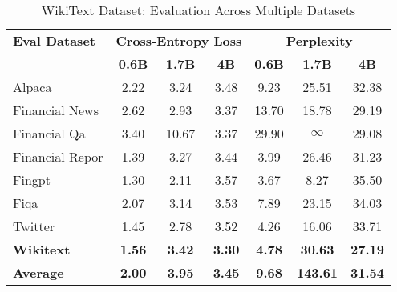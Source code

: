 
\begin{table}[h]
\centering
\caption[WikiText: Evaluation Results]{WikiText Dataset: Evaluation Across Multiple Datasets}
\label{tab:wikitext_results}
\begin{tabular}{l|ccc|ccc}
\hline
\textbf{Eval Dataset} & \multicolumn{3}{c|}{\textbf{Cross-Entropy Loss}} & \multicolumn{3}{c}{\textbf{Perplexity}} \\
\cline{2-4} \cline{5-7}
  & \textbf{0.6B} & \textbf{1.7B} & \textbf{4B} & \textbf{0.6B} & \textbf{1.7B} & \textbf{4B} \\
Alpaca & 2.22 & 3.24 & 3.48 & 9.23 & 25.51 & 32.38 \\
Financial News & 2.62 & 2.93 & 3.37 & 13.70 & 18.78 & 29.19 \\
Financial Qa & 3.40 & 10.67 & 3.37 & 29.90 & $\infty$ & 29.08 \\
Financial Repor & 1.39 & 3.27 & 3.44 & 3.99 & 26.46 & 31.23 \\
Fingpt & 1.30 & 2.11 & 3.57 & 3.67 & 8.27 & 35.50 \\
Fiqa & 2.07 & 3.14 & 3.53 & 7.89 & 23.15 & 34.03 \\
Twitter & 1.45 & 2.78 & 3.52 & 4.26 & 16.06 & 33.71 \\
\textbf{Wikitext} & \textbf{1.56} & \textbf{3.42} & \textbf{3.30} & \textbf{4.78} & \textbf{30.63} & \textbf{27.19} \\
\hline
\textbf{Average} & \textbf{2.00} & \textbf{3.95} & \textbf{3.45} & \textbf{9.68} & \textbf{143.61} & \textbf{31.54} \\
\hline
\end{tabular}
\end{table}

